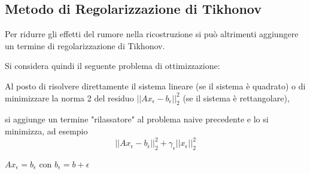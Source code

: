 {\color{ggreen}\subsection{Metodo di Regolarizzazione di Tikhonov}}
Per ridurre gli effetti del rumore nella ricostruzione si può altrimenti aggiungere un 
termine di regolarizzazione di Tikhonov. 

Si considera quindi il seguente problema di ottimizzazione:

Al posto di risolvere direttamente il sistema lineare (se il sistema è quadrato) o di minimizzare la norma 2 del residuo 
$||Ax_\epsilon -b_\epsilon||_2^2$ (se il sistema è rettangolare), 

si aggiunge un termine "rilassatore" al problema naive precedente e lo si minimizza, ad esempio 
\[||Ax_\epsilon-b_\epsilon||_2^2+\gamma_\epsilon||x_\epsilon||_2^2\] 
\begin{center} $Ax_\epsilon = b_\epsilon$ con $b_\epsilon = b+\epsilon$ \end{center}

